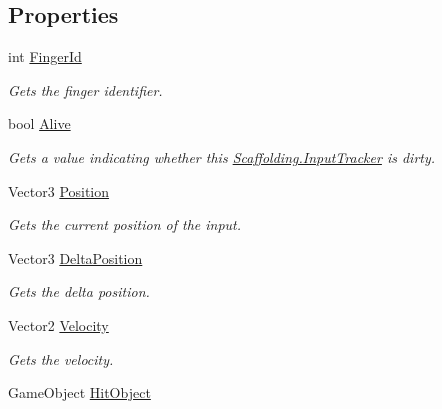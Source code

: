 \subsection*{Properties}
\begin{DoxyCompactItemize}
\item 
int \hyperlink{class_scaffolding_1_1_input_tracker_a53596ca80977b53a7d9c1931e0defaa4}{Finger\+Id}
\begin{DoxyCompactList}\small\item\em Gets the finger identifier. \end{DoxyCompactList}\item 
bool \hyperlink{class_scaffolding_1_1_input_tracker_a7a9ba2d2d88ce0e11e27ca9721117f99}{Alive}
\begin{DoxyCompactList}\small\item\em Gets a value indicating whether this \hyperlink{class_scaffolding_1_1_input_tracker}{Scaffolding.\+Input\+Tracker} is dirty. \end{DoxyCompactList}\item 
Vector3 \hyperlink{class_scaffolding_1_1_input_tracker_afc147aaaa6ab7d2406738cb97a01ef96}{Position}
\begin{DoxyCompactList}\small\item\em Gets the current position of the input. \end{DoxyCompactList}\item 
Vector3 \hyperlink{class_scaffolding_1_1_input_tracker_a88d354a4e9d4bc7791e67a0a8e19af65}{Delta\+Position}
\begin{DoxyCompactList}\small\item\em Gets the delta position. \end{DoxyCompactList}\item 
Vector2 \hyperlink{class_scaffolding_1_1_input_tracker_a2d7b1cd8114f6531a9640b5fde49f35e}{Velocity}
\begin{DoxyCompactList}\small\item\em Gets the velocity. \end{DoxyCompactList}\item 
Game\+Object \hyperlink{class_scaffolding_1_1_input_tracker_a6c539c6f8ad29e71d9426cb75194082f}{Hit\+Object}

\end{DoxyCompactItemize}
